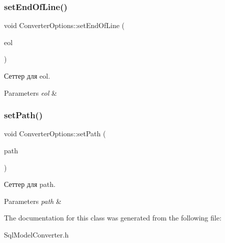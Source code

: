 \subsubsection{\texorpdfstring{set\+End\+Of\+Line()}{setEndOfLine()}}
{\footnotesize\ttfamily void Converter\+Options\+::set\+End\+Of\+Line (\begin{DoxyParamCaption}\item[{Q\+String}]{eol }\end{DoxyParamCaption})\hspace{0.3cm}{\ttfamily [inline]}}



Сеттер для eol. 


\begin{DoxyParams}{Parameters}
{\em eol} & \\
\hline
\end{DoxyParams}
\mbox{\label{class_converter_options_ad00e2c89e88aad4e4396ec2bc662c2c8}} 
\subsubsection{\texorpdfstring{set\+Path()}{setPath()}}
{\footnotesize\ttfamily void Converter\+Options\+::set\+Path (\begin{DoxyParamCaption}\item[{Q\+String}]{path }\end{DoxyParamCaption})\hspace{0.3cm}{\ttfamily [inline]}}



Сеттер для path. 


\begin{DoxyParams}{Parameters}
{\em path} & \\
\hline
\end{DoxyParams}


The documentation for this class was generated from the following file\+:\begin{DoxyCompactItemize}
\item 
Sql\+Model\+Converter.\+h\end{DoxyCompactItemize}
